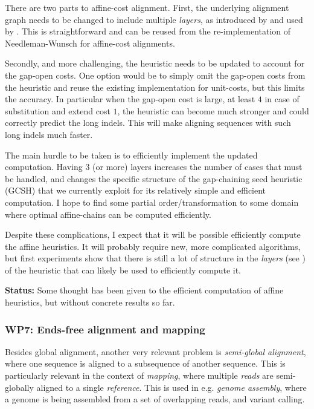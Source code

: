 \documentclass[11pt,english,a4paper]{article}
\begin{document}
There are two parts to affine-cost alignment. First, the underlying alignment graph needs to be
changed to include multiple \emph{layers}, as introduced by \textcite{gotoh} and used by
\textcite{wfa}. This is straightforward and can be reused from the re-implementation
of Needleman-Wunsch for affine-cost alignments.

Secondly, and more challenging, the heuristic needs to be updated to account for
the gap-open costs. One option would be to simply omit the gap-open costs from
the heuristic and reuse the existing implementation for unit-costs, but this
limits the accuracy. In particular when the gap-open cost is large, at least \(4\)
in case of substitution and extend cost \(1\), the heuristic can become much
stronger and could correctly predict the long indels. This will make aligning
sequences with such long indels much faster.

The main hurdle to be taken is to efficiently implement the updated computation.
Having \(3\) (or more) layers increases the number of cases that must be handled,
and changes the specific structure of the gap-chaining seed heuristic
(GCSH) that we currently exploit for its relatively simple and efficient
computation. I hope to find some partial order/transformation to some domain
where optimal affine-chains can be computed efficiently.

Despite these complications, I expect that it will be possible efficiently
compute the affine heuristics. It will probably require new, more complicated
algorithms, but first experiments show that there is still a lot of structure in
the \emph{layers} (see \textcite{astarpa}) of the heuristic that can likely be used to
efficiently compute it.

\textbf{Status:} Some thought has been given to the efficient computation of affine
heuristics, but without concrete results so far.

\subsubsection{WP7: Ends-free alignment and mapping}
\label{sec:org1d5b420}
Besides global alignment, another very relevant problem is \emph{semi-global
alignment}, where one sequence is aligned to a subsequence of another sequence.
This is particularly relevant in the context of \emph{mapping}, where multiple
\emph{reads} are semi-globally aligned to a single \emph{reference}. This is
used in e.g. \emph{genome assembly}, where a genome is being assembled from a set of
overlapping reads, and variant calling.
\end{document}
